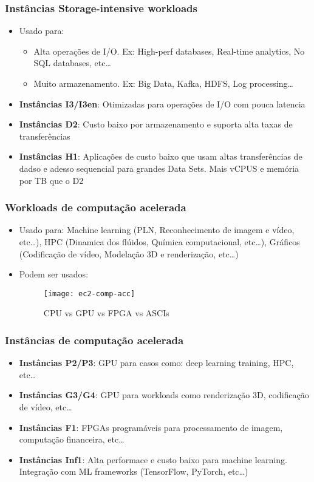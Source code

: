 \begin{frame}
	\frametitle{Instâncias Storage-intensive workloads}
	\begin{itemize}
		\item Usado para:
			\begin{itemize}
				\item Alta operações de I/O. Ex: High-perf databases, Real-time analytics, No SQL databases, etc\dots
				\item Muito armazenamento. Ex: Big Data, Kafka, HDFS, Log processing\dots
			\end{itemize}
		\item \textbf{Instâncias I3/I3en}: Otimizadas para operações de I/O com pouca latencia
		\item \textbf{Instâncias D2}: Custo baixo por armazenamento e suporta alta taxas de transferências
		\item \textbf{Instâncias H1}: Aplicações de custo baixo que usam altas transferências de dadso e adesso sequencial para grandes Data Sets. Mais vCPUS e memória por TB que o D2
	\end{itemize}
\end{frame}

\begin{frame}
	\frametitle{Workloads de computação acelerada}
	\begin{itemize}
		\item Usado para: Machine learning (PLN, Reconhecimento de imagem e vídeo, etc\dots), HPC (Dinamica dos flúidos, Química computacional, etc\dots), Gráficos (Codificação de vídeo, Modelação 3D e renderização, etc\dots)
		\item Podem ser usados:
			\begin{figure}[htpb]
				\centering
				\texttt{[image: ec2-comp-acc]}
				\caption{CPU vs GPU vs FPGA vs ASCIs\cite{CDOLR}}
			\end{figure}
	\end{itemize}
\end{frame}

\begin{frame}
	\frametitle{Instâncias de computação acelerada}
	\begin{itemize}
		\item \textbf{Instâncias P2/P3}:  GPU para casos como: deep learning training, HPC, etc\dots
		\item \textbf{Instâncias G3/G4}: GPU para workloads como renderização 3D, codificação de vídeo, etc\dots
		\item \textbf{Instâncias F1}: FPGAs programáveis para processamento de imagem, computação financeira, etc\dots
		\item \textbf{Instâncias Inf1}: Alta performace e custo baixo para machine learning. Integração com ML frameworks (TensorFlow, PyTorch, etc\dots)
	\end{itemize}
\end{frame}

